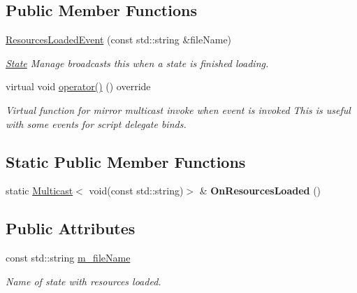 \subsection*{Public Member Functions}
\begin{DoxyCompactItemize}
\item 
\hyperlink{classResourcesLoadedEvent_abc7422721c0b41dee4b5f3687bdc4a6f}{Resources\+Loaded\+Event} (const std\+::string \&file\+Name)
\begin{DoxyCompactList}\small\item\em \hyperlink{classState}{State} Manage broadcasts this when a state is finished loading. \end{DoxyCompactList}\item 
\mbox{\label{classResourcesLoadedEvent_a6d958a083f9570afbeeee7b25fb29702}} 
virtual void \hyperlink{classResourcesLoadedEvent_a6d958a083f9570afbeeee7b25fb29702}{operator()} () override
\begin{DoxyCompactList}\small\item\em Virtual function for mirror multicast invoke when event is invoked This is useful with some events for script delegate binds. \end{DoxyCompactList}\end{DoxyCompactItemize}
\subsection*{Static Public Member Functions}
\begin{DoxyCompactItemize}
\item 
\mbox{\label{classResourcesLoadedEvent_a885b80e0d7651b5d36a148aacad14b32}} 
static \hyperlink{classMulticast}{Multicast}$<$ void(const std\+::string)$>$ \& {\bfseries On\+Resources\+Loaded} ()
\end{DoxyCompactItemize}
\subsection*{Public Attributes}
\begin{DoxyCompactItemize}
\item 
\mbox{\label{classResourcesLoadedEvent_a82f22e2b02bafb1042601841f96d1046}} 
const std\+::string \hyperlink{classResourcesLoadedEvent_a82f22e2b02bafb1042601841f96d1046}{m\+\_\+file\+Name}
\begin{DoxyCompactList}\small\item\em Name of state with resources loaded. \end{DoxyCompactList}\end{DoxyCompactItemize}

